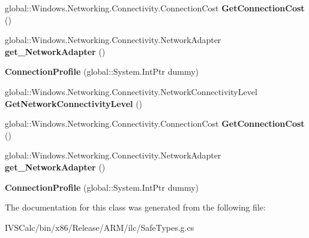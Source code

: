 \begin{DoxyCompactItemize}
\item 
\mbox{\label{class_windows_1_1_networking_1_1_connectivity_1_1_connection_profile_a01bd6c7e7e919529b206485420bd6f60}} 
global\+::\+Windows.\+Networking.\+Connectivity.\+Connection\+Cost {\bfseries Get\+Connection\+Cost} ()
\item 
\mbox{\label{class_windows_1_1_networking_1_1_connectivity_1_1_connection_profile_abdb5960f62ef424cf00e068722320644}} 
global\+::\+Windows.\+Networking.\+Connectivity.\+Network\+Adapter {\bfseries get\+\_\+\+Network\+Adapter} ()
\item 
\mbox{\label{class_windows_1_1_networking_1_1_connectivity_1_1_connection_profile_a6c18da83d8ed539cff89b26e114d89c5}} 
{\bfseries Connection\+Profile} (global\+::\+System.\+Int\+Ptr dummy)
\item 
\mbox{\label{class_windows_1_1_networking_1_1_connectivity_1_1_connection_profile_a55f464bd3626b3b75fff3314aa21599b}} 
global\+::\+Windows.\+Networking.\+Connectivity.\+Network\+Connectivity\+Level {\bfseries Get\+Network\+Connectivity\+Level} ()
\item 
\mbox{\label{class_windows_1_1_networking_1_1_connectivity_1_1_connection_profile_a01bd6c7e7e919529b206485420bd6f60}} 
global\+::\+Windows.\+Networking.\+Connectivity.\+Connection\+Cost {\bfseries Get\+Connection\+Cost} ()
\item 
\mbox{\label{class_windows_1_1_networking_1_1_connectivity_1_1_connection_profile_abdb5960f62ef424cf00e068722320644}} 
global\+::\+Windows.\+Networking.\+Connectivity.\+Network\+Adapter {\bfseries get\+\_\+\+Network\+Adapter} ()
\item 
\mbox{\label{class_windows_1_1_networking_1_1_connectivity_1_1_connection_profile_a6c18da83d8ed539cff89b26e114d89c5}} 
{\bfseries Connection\+Profile} (global\+::\+System.\+Int\+Ptr dummy)
\end{DoxyCompactItemize}


The documentation for this class was generated from the following file\+:\begin{DoxyCompactItemize}
\item 
I\+V\+S\+Calc/bin/x86/\+Release/\+A\+R\+M/ilc/Safe\+Types.\+g.\+cs\end{DoxyCompactItemize}

